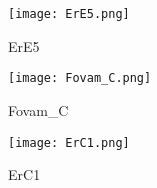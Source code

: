 \centering
\begin{sidewaysfigure}[h!]
	\centering
	\texttt{[image: ErE5.png]}
	\caption[]{ErE5}%
\end{sidewaysfigure}

\centering
\begin{sidewaysfigure}[h!]
	\centering
	\texttt{[image: Fovam\_C.png]}
	\caption[]{Fovam\_C}%
\end{sidewaysfigure}

\centering
\begin{sidewaysfigure}[h!]
	\centering
	\texttt{[image: ErC1.png]}
	\caption[]{ErC1}%
\end{sidewaysfigure}


